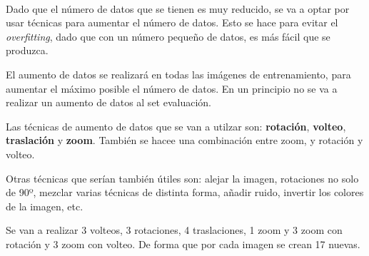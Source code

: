 \documentclass[11pt]{uc3mpracticas}
\begin{document}
    \begin{center}
    \end{center}
    { \hspace*{\fill} \\}

    Dado que el número de datos que se tienen es muy reducido, se va a optar
por usar técnicas para aumentar el número de datos. Esto se hace para
evitar el \emph{overfitting}, dado que con un número pequeño de datos,
es más fácil que se produzca.

El aumento de datos se realizará en todas las imágenes de entrenamiento,
para aumentar el máximo posible el número de datos. En un principio no
se va a realizar un aumento de datos al set evaluación.

Las técnicas de aumento de datos que se van a utilzar son:
\textbf{rotación}, \textbf{volteo}, \textbf{traslación} y \textbf{zoom}.
También se hacee una combinación entre zoom, y rotación y volteo.

Otras técnicas que serían también útiles son: alejar la imagen,
rotaciones no solo de 90º, mezclar varias técnicas de distinta forma,
añadir ruido, invertir los colores de la imagen, etc.

    Se van a realizar 3 volteos, 3 rotaciones, 4 traslaciones, 1 zoom y 3
zoom con rotación y 3 zoom con volteo. De forma que por cada imagen se
crean 17 nuevas.
\end{document}
